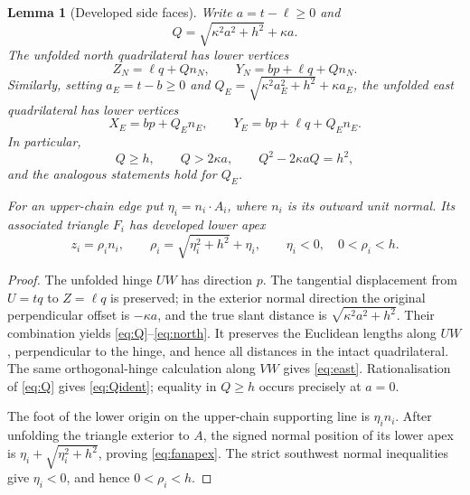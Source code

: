 \documentclass[11pt]{amsart}
\newtheorem{lemma}[theorem]{Lemma}
\begin{document}
\begin{lemma}[Developed side faces]\label{lem:development}
Write \(a=t-\ell\ge0\) and
\begin{equation}\label{eq:Q}
 Q=\sqrt{\kappa^2a^2+h^2}+\kappa a.
\end{equation}
The unfolded north quadrilateral has lower vertices
\begin{equation}\label{eq:north}
 Z_N=\ell q+Qn_N,\qquad Y_N=bp+\ell q+Qn_N.
\end{equation}
Similarly, setting \(a_E=t-b\ge0\) and \(Q_E=\sqrt{\kappa^2a_E^2+h^2}+\kappa a_E\), the unfolded east quadrilateral has lower vertices
\begin{equation}\label{eq:east}
 X_E=bp+Q_E n_E,\qquad Y_E=bp+\ell q+Q_E n_E.
\end{equation}
In particular,
\begin{equation}\label{eq:Qident}
 Q\ge h,\qquad Q>2\kappa a,\qquad Q^2-2\kappa aQ=h^2,
\end{equation}
and the analogous statements hold for \(Q_E\).

For an upper-chain edge put \(\eta_i=n_i\cdot A_i\), where \(n_i\) is its outward unit normal. Its associated triangle \(F_i\) has developed lower apex
\begin{equation}\label{eq:fanapex}
 z_i=\rho_i n_i,\qquad
 \rho_i=\sqrt{\eta_i^2+h^2}+\eta_i,
 \qquad \eta_i<0,\quad 0<\rho_i<h.
\end{equation}
\end{lemma}
\begin{proof}
The unfolded hinge \(UW\) has direction \(p\). The tangential displacement from \(U=tq\) to \(Z=\ell q\) is preserved; in the exterior normal direction the original perpendicular offset is \(-\kappa a\), and the true slant distance is \(\sqrt{\kappa^2a^2+h^2}\). Their combination yields \eqref{eq:Q}--\eqref{eq:north}. It preserves the Euclidean lengths along \(UW\), perpendicular to the hinge, and hence all distances in the intact quadrilateral. The same orthogonal-hinge calculation along \(VW\) gives \eqref{eq:east}. Rationalisation of \eqref{eq:Q} gives \eqref{eq:Qident}; equality in \(Q\ge h\) occurs precisely at \(a=0\).

The foot of the lower origin on the upper-chain supporting line is \(\eta_i n_i\). After unfolding the triangle exterior to \(A\), the signed normal position of its lower apex is \(\eta_i+\sqrt{\eta_i^2+h^2}\), proving \eqref{eq:fanapex}. The strict southwest normal inequalities give \(\eta_i<0\), and hence \(0<\rho_i<h\).
\end{proof}
\end{document}
